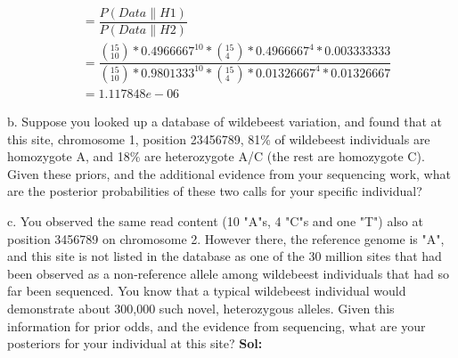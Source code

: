 \documentclass[a4paper,11pt]{article}
\begin{document}
 \begin{equation*}
	 \begin{align}
	 	& = \dfrac{P(Data\|H1)}{P(Data\|H2)} \\ 
 		& = \dfrac{(^{15}_{10})*0.4966667^{10} * (^{15}_{4}) * 0.4966667^{4} * 0.003333333}{(^{15}_{10})*0.9801333^{10} * (^{15}_{4}) * {0.01326667}^{4} * 0.01326667 } \\
 		&= 1.117848e-06
	 \end{align}
 \end{equation*}

b.  Suppose you looked up a database of wildebeest variation, and found that at this site, chromosome 1, position 23456789, 81\% of wildebeest individuals are homozygote A, and 18\% are heterozygote A/C (the rest are homozygote C). Given these priors, and the additional evidence from your sequencing work, what are the posterior probabilities of these two calls for your specific individual?


c.  You observed the same read content (10 "A"s, 4 "C"s and one "T") also at position 3456789 on chromosome 2. However there, the reference genome is "A", and this site is not listed in the database as one of the 30 million sites that had been observed as a non-reference allele among wildebeest individuals that had so far been sequenced. You know that a typical wildebeest individual would demonstrate about 300,000 such novel, heterozygous alleles. Given this information for prior odds, and the evidence from sequencing, what are your posteriors for your individual at this site?
\textbf{Sol:}
\end{document}

